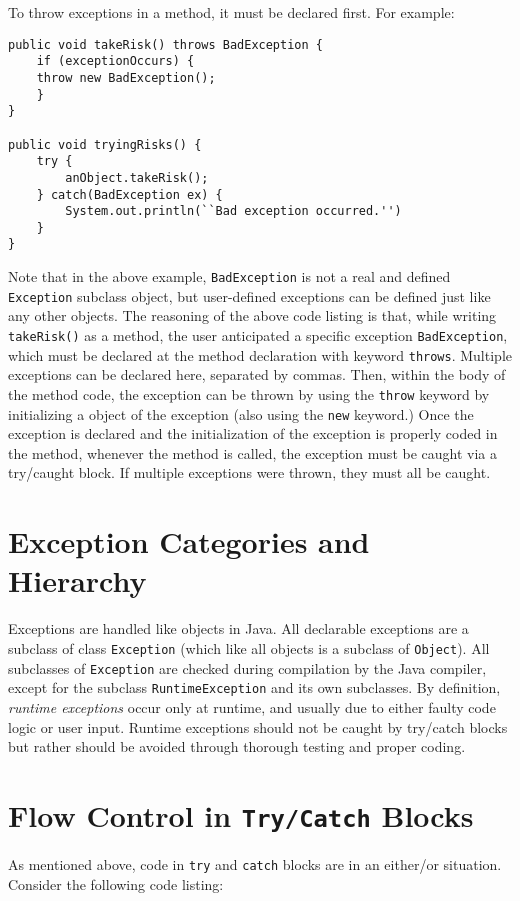 \documentclass{tufte-handout}
\begin{document}
    To throw exceptions in a method, it must be declared first. For example:

    \begin{lstlisting}
public void takeRisk() throws BadException {
    if (exceptionOccurs) {
    throw new BadException();
    }
}

public void tryingRisks() {
    try {
        anObject.takeRisk();
    } catch(BadException ex) {
        System.out.println(``Bad exception occurred.'')
    }
}
    \end{lstlisting}

    Note that in the above example, \texttt{BadException} is not a real and defined \texttt{Exception} subclass object, but user-defined exceptions can be defined just like any other objects. The reasoning of the above code listing is that, while writing \texttt{takeRisk()} as a method, the user anticipated a specific exception \texttt{BadException}, which must be declared at the method declaration with keyword \texttt{throws}. Multiple exceptions can be declared here, separated by commas. Then, within the body of the method code, the exception can be thrown by using the \texttt{throw} keyword by initializing a object of the exception (also using the \texttt{new} keyword.) Once the exception is declared and the initialization of the exception is properly coded in the method, whenever the method is called, the exception must be caught via a try/caught block. If multiple exceptions were thrown, they must all be caught.

    \section*{Exception Categories and Hierarchy}
    Exceptions are handled like objects in Java. All declarable exceptions are a subclass of class \texttt{Exception} (which like all objects is a subclass of \texttt{Object}). All subclasses of \texttt{Exception} are checked during compilation by the Java compiler, except for the subclass \texttt{RuntimeException} and its own subclasses. By definition, \emph{runtime exceptions} occur only at runtime, and usually due to either faulty code logic or user input. Runtime exceptions should not be caught by try/catch blocks but rather should be avoided through thorough testing and proper coding. 

    \section*{Flow Control in \texttt{Try/Catch} Blocks}
    As mentioned above, code in \texttt{try} and \texttt{catch} blocks are in an either/or situation. Consider the following code listing:
\end{document}
